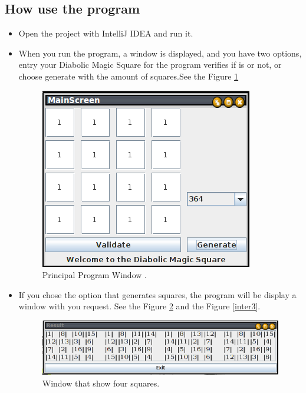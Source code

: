 \documentclass[12pt]{article}
\begin{document}
\subsection{How use the program}

\begin{itemize}
\item Open the project with IntelliJ IDEA and run it.
\item When you run the program, a window is displayed, and you have two options, entry your Diabolic Magic Square for the program verifies if is or not, or choose generate with the amount of squares.See the Figure \ref{inter1}

\begin{figure}[h!]
 	\centering
  	\includegraphics[scale=0.5]
  	{Images/inter1.png}
  	\caption{Principal Program Window .}
     \label{inter1}
\end{figure}

\item If you chose the option that generates squares, the program will be display a window with you request. See the Figure \ref{inter2} and the Figure \ref{inter3}.

\begin{figure}[h!]
 	\centering
  	\includegraphics[scale=0.5]
  	{Images/inter2.png}
  	\caption{Window that show four squares.}
     \label{inter2}
\end{figure}


\end{itemize}
\end{document}
